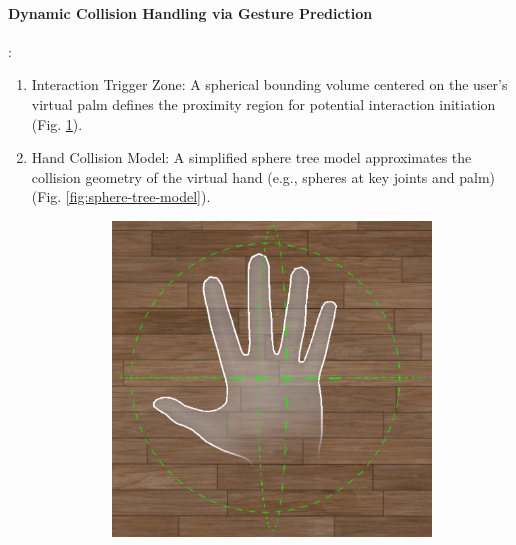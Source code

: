 \paragraph{Dynamic Collision Handling via Gesture Prediction}:
\begin{enumerate}
  \item Interaction Trigger Zone: A spherical bounding volume centered on the user's virtual palm defines the proximity region for potential interaction initiation (Fig. \ref{fig:bounding-volume}).
  \item Hand Collision Model: A simplified sphere tree model approximates the collision geometry of the virtual hand (e.g., spheres at key joints and palm) (Fig. \ref{fig:sphere-tree-model}).

  \begin{figure}
    \begin{subfigure}{0.48\linewidth} %
      \centering
      \includegraphics[width=\linewidth]{image/bounding-volume.pdf}
      \caption{} %
      \label{fig:bounding-volume}
    \end{subfigure}
    \hfill %
    \begin{subfigure}{0.48\linewidth} %
      \centering

\end{subfigure}
\end{figure}
\end{enumerate}
